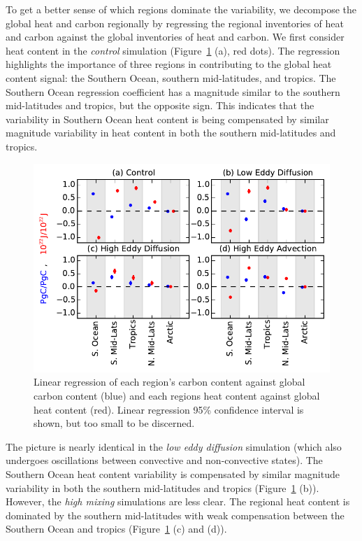 To get a better sense of which regions dominate the variability, we decompose
the global heat and carbon regionally by regressing the regional inventories of
heat and carbon against the global inventories of heat and carbon. We first
consider heat content in the \textit{control} simulation
(Figure~\ref{fig:linear_regression} (a), red dots). The regression highlights
the importance of three regions in contributing to the global heat content
signal: the Southern Ocean, southern mid-latitudes, and tropics. The Southern
Ocean regression coefficient has a magnitude similar to the southern
mid-latitudes and tropics, but the opposite sign. This indicates that the
variability in Southern Ocean heat content is being compensated by similar
magnitude variability in heat content in both the southern mid-latitudes and
tropics.

\begin{figure}
\noindent
\centering
\includegraphics[width=33pc]{figure7.pdf}
\caption{Linear regression of each region's carbon content against global carbon
content (blue) and each regions heat content against global heat content (red).
Linear regression  95\% confidence interval is shown, but too small to be
discerned.}
\label{fig:linear_regression}
\end{figure}

The picture is nearly identical in the \textit{low eddy diffusion} simulation
(which also undergoes oscillations between convective and non-convective
states). The Southern Ocean heat content variability is compensated by similar
magnitude variability in both the southern mid-latitudes and tropics
(Figure~\ref{fig:linear_regression} (b)). However, the \textit{high mixing}
simulations are less clear. The regional heat content is dominated by the
southern mid-latitudes with weak compensation between the Southern Ocean
and tropics (Figure~\ref{fig:linear_regression} (c) and (d)).

